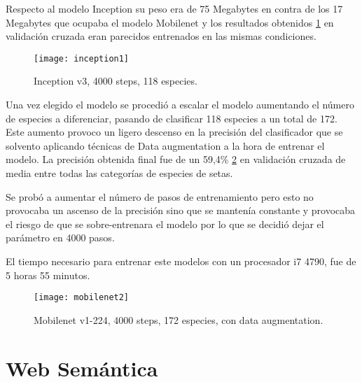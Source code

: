 Respecto al modelo Inception su peso era de 75 Megabytes en contra de los 17 Megabytes que ocupaba el modelo Mobilenet y los resultados obtenidos \ref{figInception1} en validación cruzada eran parecidos entrenados en las mismas condiciones. 

\begin{figure}[h]
    \begin{center}%
        \begin{center}%
          \texttt{[image: inception1]}%
          \caption{Inception v3, 4000 steps, 118 especies.}%
          \label{figInception1}%
        \end{center}%
  	\end{center}%
\end{figure}%

Una vez elegido el modelo se procedió a escalar el modelo aumentando el número de especies a diferenciar, pasando de clasificar 118 especies a un total de 172. Este aumento provoco un ligero descenso en la precisión del clasificador que se solvento aplicando técnicas de Data augmentation a la hora de entrenar el modelo. La precisión obtenida final fue de un 59,4\% \ref{figMobilenet2} en validación cruzada de media entre todas las categorías de especies de setas.

Se probó a aumentar el número de pasos de entrenamiento pero esto no provocaba un ascenso de la precisión sino que se mantenía constante y provocaba el riesgo de que se sobre-entrenara el modelo por lo que se decidió dejar el parámetro en 4000 pasos.

El tiempo necesario para entrenar este modelos con un procesador i7 4790, fue de 5 horas 55 minutos.

\begin{figure}[h]
    \begin{center}%
        \begin{center}%
          \texttt{[image: mobilenet2]}%
          \caption{Mobilenet v1-224, 4000 steps, 172 especies, con data augmentation.}%
          \label{figMobilenet2}%
        \end{center}%
  	\end{center}%
\end{figure}%

\section{Web Semántica}

